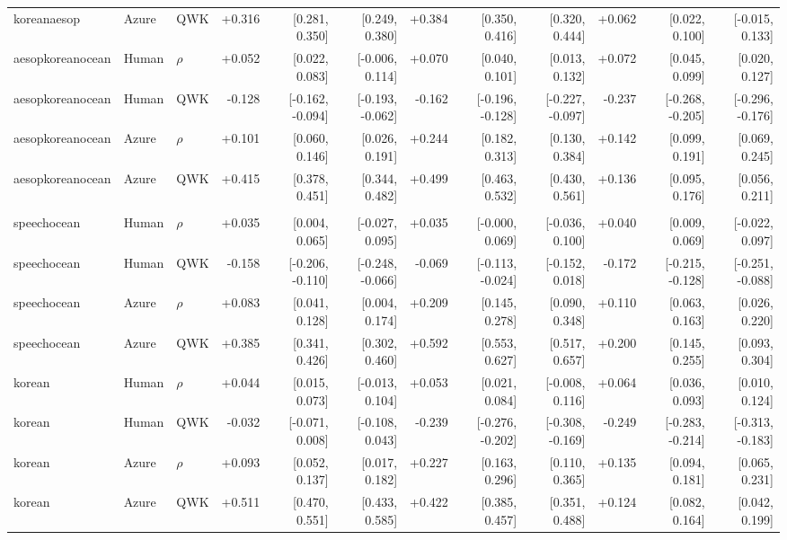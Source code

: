 \begin{landscape}
\begin{longtable}{@{}lllrrrrrrrrr@{}}
koreanaesop & Azure & QWK & +0.316 & [0.281, 0.350] & [0.249, 0.380] & +0.384 & [0.350, 0.416] & [0.320, 0.444] & +0.062 & [0.022, 0.100] & [-0.015, 0.133]\\
\addlinespace[2pt]
aesopkoreanocean & Human & $\rho$ & +0.052 & [0.022, 0.083] & [-0.006, 0.114] & +0.070 & [0.040, 0.101] & [0.013, 0.132] & +0.072 & [0.045, 0.099] & [0.020, 0.127]\\
aesopkoreanocean & Human & QWK & -0.128 & [-0.162, -0.094] & [-0.193, -0.062] & -0.162 & [-0.196, -0.128] & [-0.227, -0.097] & -0.237 & [-0.268, -0.205] & [-0.296, -0.176]\\
aesopkoreanocean & Azure & $\rho$ & +0.101 & [0.060, 0.146] & [0.026, 0.191] & +0.244 & [0.182, 0.313] & [0.130, 0.384] & +0.142 & [0.099, 0.191] & [0.069, 0.245]\\
aesopkoreanocean & Azure & QWK & +0.415 & [0.378, 0.451] & [0.344, 0.482] & +0.499 & [0.463, 0.532] & [0.430, 0.561] & +0.136 & [0.095, 0.176] & [0.056, 0.211]\\
\addlinespace[2pt]
\midrule\multicolumn{12}{l}{\textbf{H: historical-grid accuracy MAE}}\\*
speechocean & Human & $\rho$ & +0.035 & [0.004, 0.065] & [-0.027, 0.095] & +0.035 & [-0.000, 0.069] & [-0.036, 0.100] & +0.040 & [0.009, 0.069] & [-0.022, 0.097]\\
speechocean & Human & QWK & -0.158 & [-0.206, -0.110] & [-0.248, -0.066] & -0.069 & [-0.113, -0.024] & [-0.152, 0.018] & -0.172 & [-0.215, -0.128] & [-0.251, -0.088]\\
speechocean & Azure & $\rho$ & +0.083 & [0.041, 0.128] & [0.004, 0.174] & +0.209 & [0.145, 0.278] & [0.090, 0.348] & +0.110 & [0.063, 0.163] & [0.026, 0.220]\\
speechocean & Azure & QWK & +0.385 & [0.341, 0.426] & [0.302, 0.460] & +0.592 & [0.553, 0.627] & [0.517, 0.657] & +0.200 & [0.145, 0.255] & [0.093, 0.304]\\
\addlinespace[2pt]
korean & Human & $\rho$ & +0.044 & [0.015, 0.073] & [-0.013, 0.104] & +0.053 & [0.021, 0.084] & [-0.008, 0.116] & +0.064 & [0.036, 0.093] & [0.010, 0.124]\\
korean & Human & QWK & -0.032 & [-0.071, 0.008] & [-0.108, 0.043] & -0.239 & [-0.276, -0.202] & [-0.308, -0.169] & -0.249 & [-0.283, -0.214] & [-0.313, -0.183]\\
korean & Azure & $\rho$ & +0.093 & [0.052, 0.137] & [0.017, 0.182] & +0.227 & [0.163, 0.296] & [0.110, 0.365] & +0.135 & [0.094, 0.181] & [0.065, 0.231]\\
korean & Azure & QWK & +0.511 & [0.470, 0.551] & [0.433, 0.585] & +0.422 & [0.385, 0.457] & [0.351, 0.488] & +0.124 & [0.082, 0.164] & [0.042, 0.199]\\

\end{longtable}
\end{landscape}

